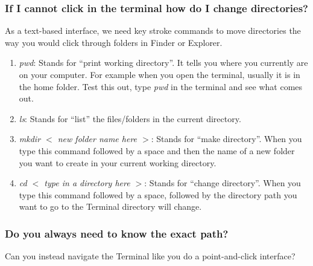 \documentclass[12pt]{article}
\begin{document}
\subsubsection{If I cannot click in the terminal how do I change directories?}

As a text-based interface, we need key stroke commands to move directories the way you would click through folders in Finder or Explorer.

\begin{enumerate}
\item \textit{pwd}: Stands for ``print working directory''. It tells you where you currently are on your computer. For example when you open the terminal, usually it is in the home folder. Test this out, type \textit{pwd} in the terminal and see what comes out. 
\item \textit{ls}: Stands for ``list'' the files/folders in the current directory. 
\item \textit{mkdir $<$ new folder name here $>$}: Stands for ``make directory''. When you type this command followed by a space and then the name of a new folder you want to create in your current working directory. 
  \item \textit{cd $<$ type in a directory here $>$}: Stands for ``change directory''. When you type this command followed by a space, followed by the directory path you want to go to the Terminal directory will change. 
\end{enumerate}

\subsubsection{Do you always need to know the exact path?}
Can you instead navigate the Terminal like you do a point-and-click interface?
\end{document}
